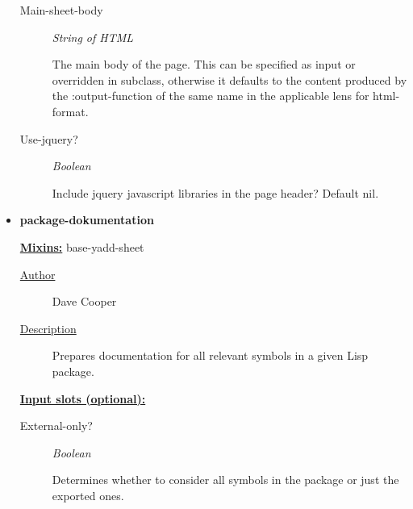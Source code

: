 \documentclass [11pt]{book}
\begin{document}
\begin{itemize}
\begin{description}
\item [Main-sheet-body]
\emph{String of HTML}

 The main body of the page.
This can be specified as input or overridden in subclass, otherwise it defaults
to the content produced by the :output-function of the same name
in the applicable lens for  html-format.




\item [Use-jquery?]
\emph{Boolean}

 Include jquery javascript libraries in the page header?
Default nil.




\end{description}







\item {}
\label{prim:package-dokumentation}
\textbf{package-dokumentation}


\textbf{
\underline{Mixins:}} base-yadd-sheet





\begin{description}

\item [
\underline{Author}]


Dave Cooper



\item [
\underline{Description}]


Prepares documentation for all relevant symbols in a given Lisp package.



\end{description}








\textbf{
\underline{Input slots (optional):}}

\begin{description}

\item [External-only?]
\emph{Boolean}

 Determines whether to consider all symbols in the package or just the exported ones.





\end{description}
\end{itemize}
\end{document}
